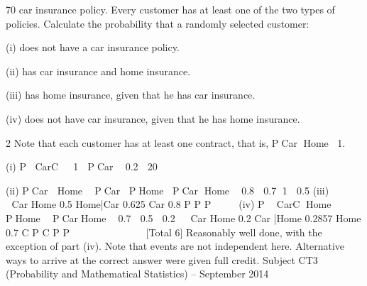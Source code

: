 \documentclass[a4paper,12pt]{article}
\begin{document}
70%
car insurance policy. Every customer has at least one of the two types of policies.
Calculate the probability that a randomly selected customer:
  \item (i) does not have a car insurance policy. 
\item (ii) has car insurance and home insurance. 
\item (iii) has home insurance, given that he has car insurance. 
\item (iv) does not have car insurance, given that he has home insurance. 


2 Note that each customer has at least one contract, that is, PCar Home 1.
\item (i) P CarC  1  PCar  0.2  20%
\item (ii) PCar  Home  PCar PHome PCar Home 
 0.8  0.7 1  0.5
(iii)    
 
Car Home 0.5 Home|Car 0.625
Car 0.8
P
P
P
    
(iv) P  CarC Home  PHome  PCarHome  0.7  0.5  0.2
 
Car Home 0.2 Car |Home 0.2857
Home 0.7
C
P C
P
P
            
[Total 6]
Reasonably well done, with the exception of part (iv). Note that events are not independent
here. Alternative ways to arrive at the correct answer were given full credit.
Subject CT3 (Probability and Mathematical Statistics) – September 2014 
\end{document}
